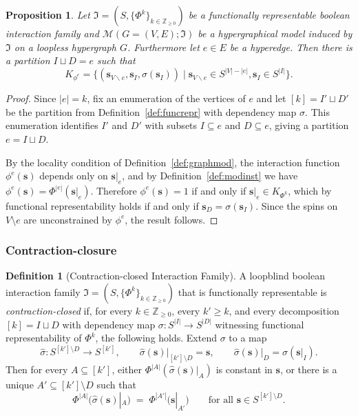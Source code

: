 \documentclass[11pt,reqno]{amsart}
\newcommand{\vecs}{\boldsymbol{s}}
\newcommand{\Mo}{\mathcal{M}}
\newcommand{\IFam}{\mathfrak{I}}
\theoremstyle{plain}
\newtheorem{proposition}[theorem]{Proposition}
\theoremstyle{definition}
\newtheorem{definition}[theorem]{Definition}
\numberwithin{equation}{section}
\begin{document}
\begin{proposition}
    \label{prop:modelfuncrep}
    Let $\IFam = (S, \{\Phi^k\}_{k \in \mathbb{Z}_{\geq 0}})$ be a functionally representable boolean interaction family and $\Mo(G=(V,E); \IFam)$ be a hypergraphical model induced by $\IFam$ on a loopless hypergraph $G$. Furthermore let $e \in E$ be a hyperedge. Then there is a partition $I \sqcup D = e$ such that
    \[
    K_{\phi^e} = \{ (\vecs_{V \backslash e}, \vecs_I, \sigma(\vecs_I)) \mid \vecs_{V \backslash e} \in S^{|V| - |e|},\vecs_I \in S^{|I|}\}.
    \]
\end{proposition}
\begin{proof}
    Since $|e| = k$, fix an enumeration of the vertices of $e$ and let $[k] = I' \sqcup D'$ be the partition from Definition~\ref{def:funcrepr} with dependency map $\sigma$. This enumeration identifies $I'$ and $D'$ with subsets $I \subseteq e$ and $D \subseteq e$, giving a partition $e = I \sqcup D$.

    By the locality condition of Definition~\ref{def:graphmod}, the interaction function $\phi^e(\vecs)$ depends only on $\vecs|_e$, and by Definition~\ref{def:modinst} we have $\phi^e(\vecs) = \Phi^{|e|}(\vecs|_e)$. Therefore $\phi^e(\vecs) = 1$ if and only if $\vecs|_e \in K_{\Phi^k}$, which by functional representability holds if and only if $\vecs_D = \sigma(\vecs_I)$. Since the spins on $V \setminus e$ are unconstrained by $\phi^e$, the result follows.
\end{proof}

\subsubsection{Contraction-closure}

\begin{definition}[Contraction-closed Interaction Family]
\label{def:contraction_closed}
A loopblind boolean interaction family $\IFam = (S, \{\Phi^k\}_{k \in \mathbb{Z}_{\geq 0}})$ that is functionally representable is \emph{contraction-closed} if, for every $k \in \mathbb{Z}_{\geq 0}$, every $k' \geq k$, and every decomposition $[k] = I \sqcup D$ with dependency map $\sigma \colon S^{|I|} \to S^{|D|}$ witnessing functional representability of $\Phi^k$, the following holds. Extend $\sigma$ to a map
\[
    \hat\sigma \colon S^{[k'] \setminus D} \longrightarrow S^{[k']},
    \qquad
    \hat\sigma(\vecs)\big|_{[k'] \setminus D} = \vecs,
    \qquad
    \hat\sigma(\vecs)\big|_{D} = \sigma(\vecs|_I).
\]
Then for every $A \subseteq [k']$, either $\Phi^{|A|}(\hat\sigma(\vecs)|_A)$ is constant in $\vecs$, or there is a unique $A' \subseteq [k'] \setminus D$ such that
\[
    \Phi^{|A|}\!\big(\hat\sigma(\vecs)|_A\big) \;=\; \Phi^{|A'|}\!\big(\vecs|_{A'}\big)
    \qquad \text{for all } \vecs \in S^{[k'] \setminus D}.
\]
\end{definition}
\end{document}
